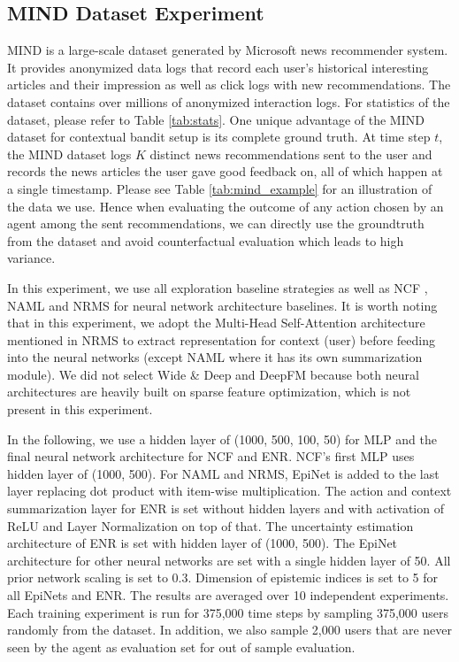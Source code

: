 \subsection{MIND Dataset Experiment \cite{wu2020mind}}
MIND is a large-scale dataset generated by Microsoft news recommender system. It provides anonymized data logs that record each user's historical interesting articles and their impression as well as click logs with new recommendations. The dataset contains over millions of anonymized interaction logs. For statistics of the dataset, please refer to Table \ref{tab:stats}. One unique advantage of the MIND dataset for contextual bandit setup is its complete ground truth. At time step $t$, the MIND dataset logs $K$ distinct news recommendations sent to the user and records the news articles the user gave good feedback on, all of which happen at a single timestamp. Please see Table \ref{tab:mind_example} for an illustration of the data we use.  Hence when evaluating the outcome of any action chosen by an agent among the sent recommendations, we can directly use the groundtruth from the dataset and avoid counterfactual evaluation which leads to high variance. 

 In this experiment, we use all exploration baseline strategies as well as NCF \cite{he2017neural}, NAML \cite{wu2019naml} and NRMS \cite{wu2019neural} for neural network architecture baselines. It is worth noting that in this experiment, we adopt the Multi-Head Self-Attention architecture mentioned in NRMS \cite{wu2019neural} to extract representation for context (user) before feeding into the neural networks (except NAML where it has its own summarization module). We did not select Wide \& Deep and DeepFM because both neural architectures are heavily built on sparse feature optimization, which is not present in this experiment.

In the following, we use a hidden layer of (1000, 500, 100, 50) for MLP and the final neural network architecture for NCF and ENR. NCF's first MLP uses hidden layer of (1000, 500). For NAML and NRMS, EpiNet is added to the last layer replacing dot product with item-wise multiplication. The action and context summarization layer for ENR is set without hidden layers and with activation of ReLU and Layer Normalization on top of that. The uncertainty estimation architecture of ENR is set with hidden layer of (1000, 500). The EpiNet architecture for other neural networks are set with a single hidden layer of 50. All prior network scaling is set to 0.3. Dimension of epistemic indices is set to 5 for all EpiNets and ENR. The results are averaged over 10 independent experiments. Each training experiment is run for 375,000 time steps by sampling 375,000 users randomly from the dataset. In addition, we also sample 2,000 users that are never seen by the agent as evaluation set for out of sample evaluation.

